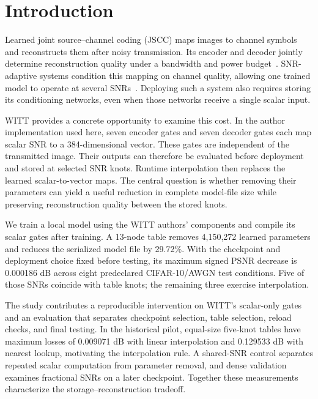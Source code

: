 \section{Introduction}
Learned joint source--channel coding (JSCC) maps images to channel symbols and reconstructs them after noisy transmission. Its encoder and decoder jointly determine reconstruction quality under a bandwidth and power budget~\cite{bourtsoulatze2019deep}. SNR-adaptive systems condition this mapping on channel quality, allowing one trained model to operate at several SNRs~\cite{xu2022adaptive,yang2023witt}. Deploying such a system also requires storing its conditioning networks, even when those networks receive a single scalar input.

WITT provides a concrete opportunity to examine this cost. In the author implementation used here, seven encoder gates and seven decoder gates each map scalar SNR to a 384-dimensional vector. These gates are independent of the transmitted image. Their outputs can therefore be evaluated before deployment and stored at selected SNR knots. Runtime interpolation then replaces the learned scalar-to-vector maps. The central question is whether removing their parameters can yield a useful reduction in complete model-file size while preserving reconstruction quality between the stored knots.

We train a local model using the WITT authors' components and compile its scalar gates after training. A 13-node table removes 4,150,272 learned parameters and reduces the serialized model file by 29.72\%. With the checkpoint and deployment choice fixed before testing, its maximum signed PSNR decrease is 0.000186 dB across eight predeclared CIFAR-10/AWGN test conditions. Five of those SNRs coincide with table knots; the remaining three exercise interpolation.

The study contributes a reproducible intervention on WITT's scalar-only gates and an evaluation that separates checkpoint selection, table selection, reload checks, and final testing. In the historical pilot, equal-size five-knot tables have maximum losses of 0.009071 dB with linear interpolation and 0.129533 dB with nearest lookup, motivating the interpolation rule. A shared-SNR control separates repeated scalar computation from parameter removal, and dense validation examines fractional SNRs on a later checkpoint. Together these measurements characterize the storage--reconstruction tradeoff.

